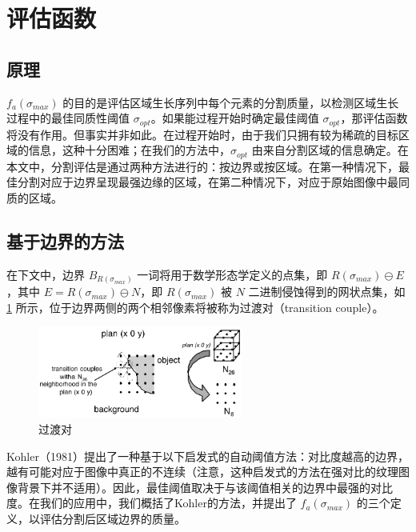 \section{评估函数}\label{sec:assessment_function}

\subsection{原理}

$f_{a}(\sigma_{max})$ 的目的是评估区域生长序列中每个元素的分割质量，以检测区域生长过程中的最佳同质性阈值 $\sigma_{opt}$。如果能过程开始时确定最佳阈值 $\sigma_{opt}$，那评估函数将没有作用。但事实并非如此。在过程开始时，由于我们只拥有较为稀疏的目标区域的信息，这种十分困难；在我们的方法中，$\sigma_{opt}$ 由来自分割区域的信息确定。在本文中，分割评估是通过两种方法进行的：按边界或按区域。在第一种情况下，最佳分割对应于边界呈现最强边缘的区域，在第二种情况下，对应于原始图像中最同质的区域。

\subsection{基于边界的方法}

在下文中，边界 $B_{R(\sigma_{max})}$ 一词将用于数学形态学定义的点集，即 $R(\sigma_{max}) \ominus E$，其中 $E = R(\sigma_{max}) \ominus N$，即 $R(\sigma_{max})$ 被 $N$ 二进制侵蚀得到的网状点集，如 \cref{fig:过渡对} 所示，位于边界两侧的两个相邻像素将被称为过渡对（transition couple）。

\begin{figure}[htbp]
    \centering
    \includegraphics[width=0.6\textwidth]{figures/过渡对.png}
    \caption{过渡对}
    \label{fig:过渡对}
\end{figure}

Kohler（1981）\cite{kohler1981segmentation}提出了一种基于以下启发式的自动阈值方法：对比度越高的边界，越有可能对应于图像中真正的不连续（注意，这种启发式的方法在强对比的纹理图像背景下并不适用）。因此，最佳阈值取决于与该阈值相关的边界中最强的对比度。在我们的应用中，我们概括了Kohler的方法，并提出了 $f_{a}(\sigma_{max})$ 的三个定义，以评估分割后区域边界的质量。

